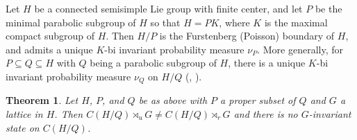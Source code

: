 \documentclass[12pt]{amsart}
\newtheorem{thm}{Theorem}[section]
\theoremstyle{definition}
\theoremstyle{remark}
\numberwithin{equation}{section}
\begin{document}
\smallskip

Let $H$ be a connected semisimple Lie group with finite center, and let $P$ be the minimal parabolic subgroup of $H$ so that $H=PK$, where $K$ is the maximal compact subgroup of $H$. Then $H/P$ is the Furstenberg (Poisson) boundary of $H$, and admits a unique $K$-bi invariant probability measure $\nu_P$. More generally, for $P\subseteq Q\subseteq H$ with $Q$ being a parabolic subgroup of $H$, there is a unique $K$-bi invariant probability measure $\nu_Q$ on $H/Q$ (\cite{Fur63}, \cite{NevoZimmer2002}). 

\begin{thm}
Let $H$, $P$, and $Q$ be as above with $P$ a proper subset of $Q$ and $G$ a lattice in $H$. Then  $C(H/Q)\rtimes_u G\neq C(H/Q)\rtimes_r G$ and there is no $G$-invariant state on $C(H/Q)$.     
\end{thm}
\end{document}
